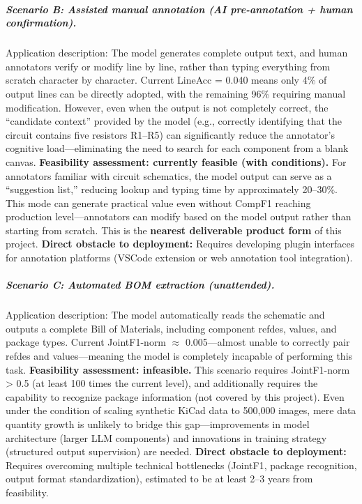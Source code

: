 \subparagraph{Scenario B: Assisted manual annotation (AI pre-annotation + human confirmation).}
Application description: The model generates complete output text, and human annotators verify or modify line by line, rather than typing everything from scratch character by character. Current LineAcc = 0.040 means only 4\% of output lines can be directly adopted, with the remaining 96\% requiring manual modification. However, even when the output is not completely correct, the ``candidate context'' provided by the model (e.g., correctly identifying that the circuit contains five resistors R1--R5) can significantly reduce the annotator's cognitive load---eliminating the need to search for each component from a blank canvas.
\textbf{Feasibility assessment: currently feasible (with conditions).} For annotators familiar with circuit schematics, the model output can serve as a ``suggestion list,'' reducing lookup and typing time by approximately 20--30\%. This mode can generate practical value even without CompF1 reaching production level---annotators can modify based on the model output rather than starting from scratch. This is the \textbf{nearest deliverable product form} of this project.
\textbf{Direct obstacle to deployment:} Requires developing plugin interfaces for annotation platforms (VSCode extension or web annotation tool integration).

\subparagraph{Scenario C: Automated BOM extraction (unattended).}
Application description: The model automatically reads the schematic and outputs a complete Bill of Materials, including component refdes, values, and package types. Current JointF1-norm $\approx$ 0.005---almost unable to correctly pair refdes and values---meaning the model is completely incapable of performing this task.
\textbf{Feasibility assessment: infeasible.} This scenario requires JointF1-norm > 0.5 (at least 100 times the current level), and additionally requires the capability to recognize package information (not covered by this project). Even under the condition of scaling synthetic KiCad data to 500,000 images, mere data quantity growth is unlikely to bridge this gap---improvements in model architecture (larger LLM components) and innovations in training strategy (structured output supervision) are needed.
\textbf{Direct obstacle to deployment:} Requires overcoming multiple technical bottlenecks (JointF1, package recognition, output format standardization), estimated to be at least 2--3 years from feasibility.

